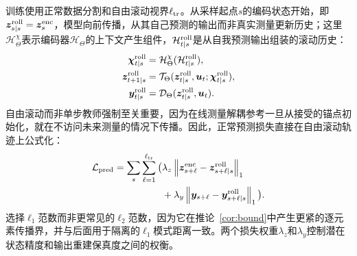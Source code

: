 \documentclass[journal]{IEEEtran}
\newcommand{\norm}[1]{\left\lVert #1\right\rVert}
\newcommand{\1}{\bm 1}
\begin{document}
训练使用正常数据分割和自由滚动视界$\ell_{\rm tr}$。从采样起点$s$的编码状态开始，即$\bm z_{s\mid s}^{\rm roll}=\bm z_s^{\rm enc}$，模型向前传播，从其自己预测的输出而非真实测量更新历史；这里$\mathcal H_\Theta^\chi$表示编码器$\mathcal H_\Theta$的上下文产生组件，$\mathcal H_{t\mid s}^{\rm roll}$是从自我预测输出组装的滚动历史：
\begin{equation}
\begin{aligned}
\bm\chi_{t\mid s}^{\rm roll}
&=\mathcal H_\Theta^\chi(\mathcal H_{t\mid s}^{\rm roll}),\\
\bm z_{t+1\mid s}^{\rm roll}
&=\mathcal T_\Theta(\bm z_{t\mid s}^{\rm roll},\bm u_t;
\bm\chi_{t\mid s}^{\rm roll}),\\
\bm y_{t\mid s}^{\rm roll}
&=\mathcal D_\Theta(\bm z_{t\mid s}^{\rm roll},\bm u_t).
\end{aligned}
\label{eq:free_rollout}
\end{equation}
自由滚动而非单步教师强制至关重要，因为在线测量解耦参考一旦从接受的锚点初始化，就在不访问未来测量的情况下传播。因此，正常预测损失直接在自由滚动轨迹上公式化：
\begin{equation}
\begin{aligned}
\mathcal L_{\rm pred}
=\sum_s\sum_{\ell=1}^{\ell_{\rm tr}}\big(&
\lambda_z\norm{\bm z_{s+\ell}^{\rm enc}
-\bm z_{s+\ell\mid s}^{\rm roll}}_1\\
&+
\lambda_y\norm{\bm y_{s+\ell}
-\bm y_{s+\ell\mid s}^{\rm roll}}_1
\big).
\end{aligned}
\label{eq:prediction_loss}
\end{equation}
选择$\ell_1$范数而非更常见的$\ell_2$范数，因为它在推论~\ref{cor:bound}中产生更紧的逐元素传播界，并与后面用于隔离的$\ell_1$模式距离一致。两个损失权重$\lambda_z$和$\lambda_y$控制潜在状态精度和输出重建保真度之间的权衡。
\end{document}
